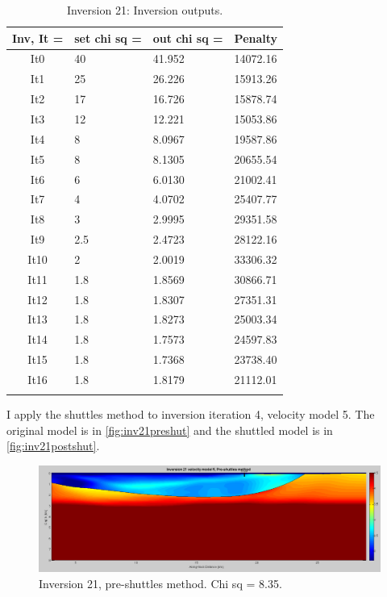 \documentclass[fontsize=11pt, %
                             paper=a4, %
                             twoside, %
                             captions=tableheading,
                             index=totoc,
                             hyperref]{labbook}
\begin{document}
\begin{addmargin}[4cm]{0cm}
\begin{table}[!ht]
\label{tab:i21}
\raggedleft
\begin{tabular}{c l l l}
\toprule
\textbf{Inv, It = } & \textbf{set chi sq =} & \textbf{out chi sq =} & \textbf{Penalty} \\
\toprule
It0 & 40 & 41.952 & 14072.16\\
It1 & 25 & 26.226 & 15913.26\\
It2 & 17 & 16.726 & 15878.74\\
It3 & 12 & 12.221 & 15053.86\\
It4 & 8 & 8.0967 & 19587.86\\
It5 & 8 & 8.1305 & 20655.54\\
It6 & 6 & 6.0130 & 21002.41\\
It7 & 4 & 4.0702 & 25407.77\\
It8 & 3 & 2.9995 & 29351.58\\
It9 & 2.5 & 2.4723 & 28122.16\\
It10 & 2 & 2.0019 & 33306.32\\
It11 & 1.8 & 1.8569 & 30866.71\\
It12 & 1.8 & 1.8307 & 27351.31\\
It13 & 1.8 & 1.8273 & 25003.34\\
It14 & 1.8 & 1.7573 & 24597.83\\
It15 & 1.8 & 1.7368 & 23738.40\\
It16 & 1.8 & 1.8179 & 21112.01\\
\bottomrule\\
\end{tabular}
\caption{Inversion 21: Inversion outputs.}
\end{table}

\clearpage{}

I apply the shuttles method to inversion iteration 4, velocity model 5.  The original model is in \autoref{fig:inv21preshut} and the shuttled model is in \autoref{fig:inv21postshut}.

\begin{figure}[h!]
\raggedleft
\includegraphics[scale=0.3,keepaspectratio=true]{figs/inv21_preshut.png}
\caption{Inversion 21, pre-shuttles method.  Chi sq = 8.35.}
\label{fig:inv21preshut}
\end{figure} 


\end{addmargin}
\end{document}
